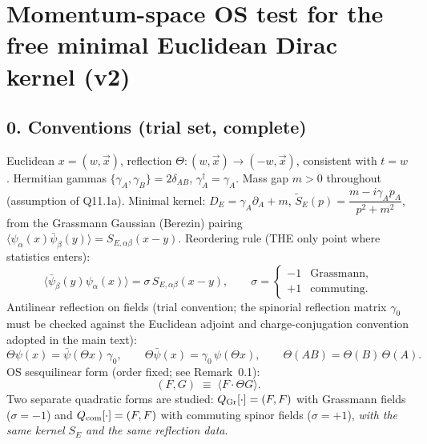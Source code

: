
\section*{Momentum-space OS test for the free minimal Euclidean
Dirac kernel (v2)}

\subsection*{0. Conventions (trial set, complete)}
Euclidean $x=(w,\vec x)$, reflection $\Theta:(w,\vec x)\to(-w,\vec x)$,
consistent with $t=w$.
Hermitian gammas $\{\gamma_A,\gamma_B\}=2\delta_{AB}$,
$\gamma_A^\dagger=\gamma_A$.
Mass gap $m>0$ throughout (assumption of Q11.1a).
Minimal kernel: $D_E=\gamma_A\partial_A+m$,
$\tilde S_E(p)=\dfrac{m-i\gamma_Ap_A}{p^2+m^2}$,
from the Grassmann Gaussian (Berezin) pairing
$\langle\psi_\alpha(x)\bar\psi_\beta(y)\rangle=S_{E,\alpha\beta}(x-y)$.
Reordering rule (THE only point where statistics enters):
\[
\langle\bar\psi_\beta(y)\psi_\alpha(x)\rangle
=\sigma\,S_{E,\alpha\beta}(x-y),
\qquad
\sigma=\begin{cases}-1 & \text{Grassmann},\\
+1 & \text{commuting}.\end{cases}
\]
Antilinear reflection on fields (trial convention; the spinorial
reflection matrix $\gamma_0$ must be checked against the Euclidean
adjoint and charge-conjugation convention adopted in the main text):
\[
\Theta\psi(x)=\bar\psi(\Theta x)\,\gamma_0,
\qquad
\Theta\bar\psi(x)=\gamma_0\,\psi(\Theta x),
\qquad
\Theta(AB)=\Theta(B)\,\Theta(A).
\]
OS sesquilinear form (order fixed; see Remark~0.1):
\[
(F,G)\;\equiv\;\bigl\langle F\cdot\Theta G\bigr\rangle .
\]
Two separate quadratic forms are studied:
$Q_{\rm Gr}[\cdot]=(F,F)$ with Grassmann fields ($\sigma=-1$) and
$Q_{\rm com}[\cdot]=(F,F)$ with commuting spinor fields
($\sigma=+1$), \emph{with the same kernel $S_E$ and the same
reflection data}.

